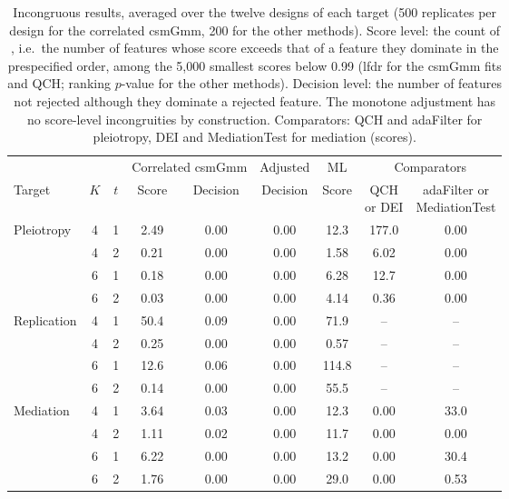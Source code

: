 \begin{table}[!htbp]
\centering
\caption{Incongruous results, averaged over the twelve designs of each target (500 replicates per design for the correlated csmGmm, 200 for the other methods). Score level: the count of \citet{Sun2025}, i.e.\ the number of features whose score exceeds that of a feature they dominate in the prespecified order, among the 5{,}000 smallest scores below 0.99 (lfdr for the csmGmm fits and QCH; ranking $p$-value for the other methods). Decision level: the number of features not rejected although they dominate a rejected feature. The monotone adjustment has no score-level incongruities by construction. Comparators: QCH and adaFilter for pleiotropy, DEI and MediationTest for mediation (scores).}\label{tab:incongruity-overall}
\small
\begin{tabular}{lcc cc c c cc}
\toprule
 & & & \multicolumn{2}{c}{Correlated csmGmm} & Adjusted & ML & \multicolumn{2}{c}{Comparators}\\
\cmidrule(lr){4-5}\cmidrule(lr){6-6}\cmidrule(lr){7-7}\cmidrule(lr){8-9}
Target & $K$ & $t$ & Score & Decision & Decision & Score & \shortstack{QCH\\or DEI} & \shortstack{adaFilter or\\MediationTest}\\
\midrule
Pleiotropy & 4 & 1 & 2.49 & 0.00 & 0.00 & 12.3 & 177.0 & 0.00\\
 & 4 & 2 & 0.21 & 0.00 & 0.00 & 1.58 & 6.02 & 0.00\\
 & 6 & 1 & 0.18 & 0.00 & 0.00 & 6.28 & 12.7 & 0.00\\
 & 6 & 2 & 0.03 & 0.00 & 0.00 & 4.14 & 0.36 & 0.00\\
\midrule
Replication & 4 & 1 & 50.4 & 0.09 & 0.00 & 71.9 & -- & --\\
 & 4 & 2 & 0.25 & 0.00 & 0.00 & 0.57 & -- & --\\
 & 6 & 1 & 12.6 & 0.06 & 0.00 & 114.8 & -- & --\\
 & 6 & 2 & 0.14 & 0.00 & 0.00 & 55.5 & -- & --\\
\midrule
Mediation & 4 & 1 & 3.64 & 0.03 & 0.00 & 12.3 & 0.00 & 33.0\\
 & 4 & 2 & 1.11 & 0.02 & 0.00 & 11.7 & 0.00 & 0.00\\
 & 6 & 1 & 6.22 & 0.00 & 0.00 & 13.2 & 0.00 & 30.4\\
 & 6 & 2 & 1.76 & 0.00 & 0.00 & 29.0 & 0.00 & 0.53\\
\bottomrule
\end{tabular}
\end{table}
